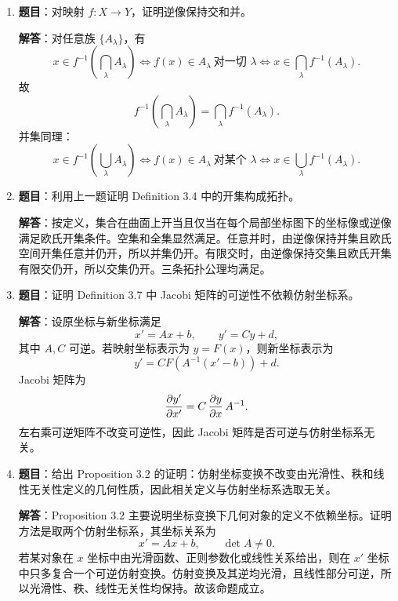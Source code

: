 \documentclass[UTF8,12pt,a4paper]{ctexart}
\begin{document}
\begin{enumerate}
\textbf{解答}：一般仿射变换 $x\mapsto Ax+b$ 不保持欧氏长度，因此一般情形下长度比不是仿射不变量。若两条有向线段
\[
\overrightarrow{x_1x_2},\qquad \overrightarrow{x_3x_4}
\]
线性相关，即两线段平行，则设 $\overrightarrow{x_1x_2}=c\,\overrightarrow{x_3x_4}$。仿射变换后
\[
A\overrightarrow{x_1x_2}=c\,A\overrightarrow{x_3x_4},
\]
于是长度比仍为 $|c|$。因此在任意仿射变换下，$\lambda$ 成为仿射几何量的典型条件是两比较线段平行；若只讨论欧氏运动或相似变换，则任意两段的长度比都保持。

\item \textbf{题目}：对映射 $f:X\to Y$，证明逆像保持交和并。

\textbf{解答}：对任意族 $\{A_\lambda\}$，有
\[
x\in f^{-1}\left(\bigcap_\lambda A_\lambda\right)
\Longleftrightarrow f(x)\in A_\lambda\ \text{对一切 }\lambda
\Longleftrightarrow x\in \bigcap_\lambda f^{-1}(A_\lambda).
\]
故
\[
f^{-1}\left(\bigcap_\lambda A_\lambda\right)=\bigcap_\lambda f^{-1}(A_\lambda).
\]
并集同理：
\[
x\in f^{-1}\left(\bigcup_\lambda A_\lambda\right)
\Longleftrightarrow f(x)\in A_\lambda\ \text{对某个 }\lambda
\Longleftrightarrow x\in \bigcup_\lambda f^{-1}(A_\lambda).
\]

\item \textbf{题目}：利用上一题证明 Definition 3.4 中的开集构成拓扑。

\textbf{解答}：按定义，集合在曲面上开当且仅当在每个局部坐标图下的坐标像或逆像满足欧氏开集条件。空集和全集显然满足。任意并时，由逆像保持并集且欧氏空间开集任意并仍开，所以并集仍开。有限交时，由逆像保持交集且欧氏开集有限交仍开，所以交集仍开。三条拓扑公理均满足。

\item \textbf{题目}：证明 Definition 3.7 中 Jacobi 矩阵的可逆性不依赖仿射坐标系。

\textbf{解答}：设原坐标与新坐标满足
\[
x'=Ax+b,\qquad y'=Cy+d,
\]
其中 $A,C$ 可逆。若映射坐标表示为 $y=F(x)$，则新坐标表示为
\[
y'=C F(A^{-1}(x'-b))+d.
\]
Jacobi 矩阵为
\[
{ \partial y'\over \partial x'}
=C\,{ \partial y\over \partial x}\,A^{-1}.
\]
左右乘可逆矩阵不改变可逆性，因此 Jacobi 矩阵是否可逆与仿射坐标系无关。

\item \textbf{题目}：给出 Proposition 3.2 的证明：仿射坐标变换不改变由光滑性、秩和线性无关性定义的几何性质，因此相关定义与仿射坐标系选取无关。

\textbf{解答}：Proposition 3.2 主要说明坐标变换下几何对象的定义不依赖坐标。证明方法是取两个仿射坐标系，其坐标关系为
\[
x'=Ax+b,\qquad \det A\ne0.
\]
若某对象在 $x$ 坐标中由光滑函数、正则参数化或线性关系给出，则在 $x'$ 坐标中只多复合一个可逆仿射变换。仿射变换及其逆均光滑，且线性部分可逆，所以光滑性、秩、线性无关性均保持。故该命题成立。


\end{enumerate}
\end{document}
